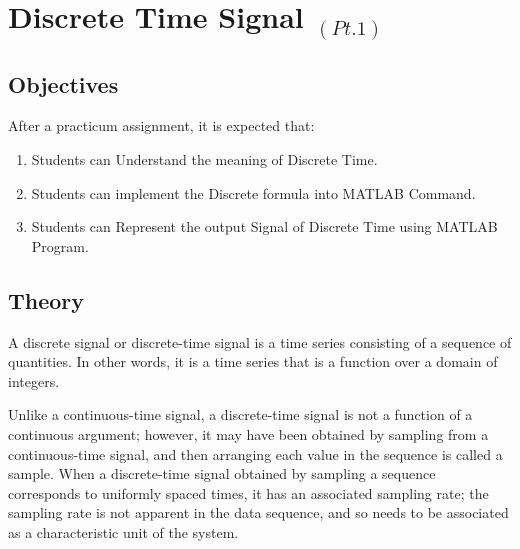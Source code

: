 \documentclass[]{report}
\begin{document}
\chapter{Discrete Time Signal $_{(Pt.1)}$}
\section{Objectives}
	\par 
	After a practicum assignment, it is expected that:	
	\begin{enumerate}
		\item Students can Understand the meaning of Discrete Time.
		\item Students can implement the Discrete formula into MATLAB Command.
		\item Students can Represent the output Signal of Discrete Time using MATLAB Program.
	\end{enumerate}

\section{Theory}
	\par 
	A discrete signal or discrete-time signal is a time series consisting of a sequence of quantities. In other words, it is a time series that is a function over a domain of integers.
	
	\par 
	Unlike a continuous-time signal, a discrete-time signal is not a function of a continuous argument; however, it may have been obtained by sampling from a continuous-time signal, and then arranging each value in the sequence is called a sample. When a discrete-time signal obtained by sampling a sequence corresponds to uniformly spaced times, it has an associated sampling rate; the sampling rate is not apparent in the data sequence, and so needs to be associated as a characteristic unit of the system.
	
\end{document}

